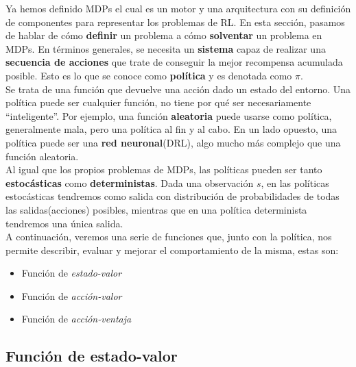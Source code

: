 \documentclass[11pt,fleqn]{book} %
\begin{document}
Ya hemos definido MDPs el cual es un motor y una arquitectura con su definición de componentes para representar los problemas de RL. En esta sección, pasamos de hablar de cómo \textbf{definir} un problema a cómo \textbf{solventar} un problema en MDPs. En términos generales, se necesita un \textbf{sistema} capaz de realizar una \textbf{secuencia de acciones} que trate de conseguir la mejor recompensa acumulada posible. Esto es lo que se conoce como \textbf{política} y es denotada como $\pi$.\\

Se trata de una función que devuelve una acción dado un estado del entorno. Una política puede ser cualquier función, no tiene por qué ser necesariamente ``inteligente''. Por ejemplo, una función \textbf{aleatoria} puede usarse como política, generalmente mala, pero una política al fin y al cabo. En un lado opuesto, una política puede ser una \textbf{red neuronal}(DRL), algo mucho más complejo que una función aleatoria.\\

Al igual que los propios problemas de MDPs, las políticas pueden ser tanto \textbf{estocásticas} como \textbf{deterministas}. Dada una observación $s$, en las políticas estocásticas tendremos como salida con distribución de probabilidades de todas las salidas(acciones) posibles, mientras que en una política determinista tendremos una única salida. \\

A continuación, veremos una serie de funciones que, junto con la política, nos permite describir, evaluar y mejorar el comportamiento de la misma, estas son:\\

\begin{itemize}
	\item Función de \textit{estado-valor}\\
	
	\item Función de \textit{acción-valor}\\
	
	\item Función de \textit{acción-ventaja}\\
\end{itemize}

\subsection{Función de estado-valor}
\end{document}
